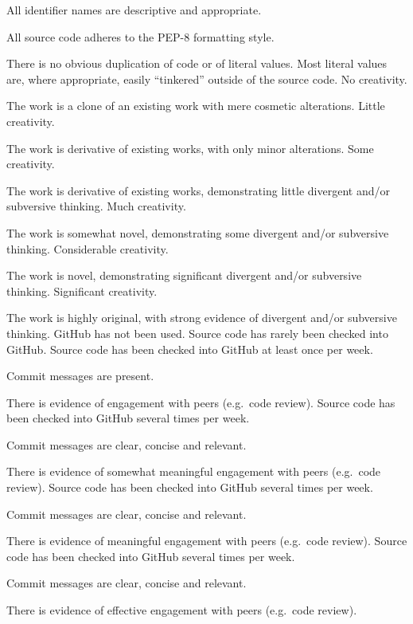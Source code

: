 \documentclass{../../fal_assignment}
\begin{document}
\begin{markingrubric}
	\par All identifier names are descriptive and appropriate.
	\par All source code adheres to the PEP-8 formatting style.
	\par There is no obvious duplication of code or of literal values. Most literal values are, where appropriate, easily ``tinkered'' outside of the source code.  
	\grade\fail No creativity.
	\par The work is a clone of an existing work with mere cosmetic alterations.
	\grade Little creativity.
	\par The work is derivative of existing works, with only minor alterations.
	\grade Some creativity.
	\par The work is derivative of existing works, demonstrating little divergent and/or subversive thinking.
	\grade Much creativity.
	\par The work is somewhat novel, demonstrating some divergent and/or subversive thinking.
	\grade Considerable creativity.
	\par The work is novel, demonstrating significant divergent and/or subversive thinking.
	\grade Significant creativity.
	\par The work is highly original, with strong evidence of divergent and/or subversive thinking.
	\grade\fail GitHub has not been used.
	\grade Source code has rarely been checked into GitHub.
	\grade Source code  has been checked into GitHub at least once per week.
	\par Commit messages are present.
	\par There is evidence of engagement with peers (e.g.\ code review).
	\grade Source code  has been checked into GitHub several times per week.
	\par Commit messages are clear, concise and relevant.
	\par There is evidence of somewhat meaningful engagement with peers (e.g.\ code review).
	\grade Source code has been checked into GitHub several times per week.
	\par Commit messages are clear, concise and relevant.
	\par There is evidence of meaningful engagement with peers (e.g.\ code review).
	\grade Source code has been checked into GitHub several times per week.
	\par Commit messages are clear, concise and relevant.
	\par There is evidence of effective engagement with peers (e.g.\ code review).
\end{markingrubric}
\end{document}
